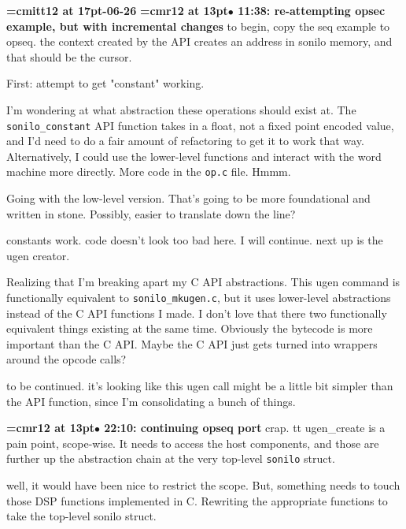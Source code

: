 {\medskip\noindent\bf\font\titlefont=cmitt12 at 17pt-06-26}\medskip
{\smallskip\noindent\bf\font\titlefont=cmr12 at 13pt\titlefont $\bullet$ 11:38: re-attempting opsec example, but with incremental changes}\smallskip
to begin, copy the seq example to opseq. the context created by the API creates an address in sonilo memory, and that should be the cursor.
\par

First: attempt to get "constant" working.
\par

I'm wondering at what abstraction these operations should exist at. The {\tt sonilo\_constant} API function takes in a float, not a fixed point encoded value, and I'd need to do a fair amount of refactoring to get it to work that way. Alternatively, I could use the lower-level functions and interact with the word machine more directly. More code in the {\tt op.c} file. Hmmm.
\par

Going with the low-level version. That's going to be more foundational and written in stone. Possibly, easier to translate down the line?
\par

constants work. code doesn't look too bad here. I will continue. next up is the ugen creator.
\par

Realizing that I'm breaking apart my C API abstractions. This ugen command is functionally equivalent to {\tt sonilo\_mkugen.c}, but it uses lower-level abstractions instead of the C API functions I made. I don't love that there two functionally equivalent things existing at the same time. Obviously the bytecode is more important than the C API. Maybe the C API just gets turned into wrappers around the opcode calls?
\par

to be continued. it's looking like this ugen call might be a little bit simpler than the API function, since I'm consolidating a bunch of things.
\par

{\smallskip\noindent\bf\font\titlefont=cmr12 at 13pt\titlefont $\bullet$ 22:10: continuing opseq port}\smallskip
crap. {tt ugen\_create} is a pain point, scope-wise. It needs to access the host components, and those are further up the abstraction chain at the very top-level {\tt sonilo} struct.
\par

well, it would have been nice to restrict the scope. But, something needs to touch those DSP functions implemented in C. Rewriting the appropriate functions to take the top-level sonilo struct.
\par

